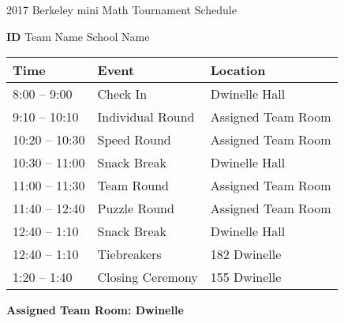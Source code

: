 \documentclass[12pt]{amsart}
\begin{document}
\renewcommand\arraystretch{3.5}
\newcommand{\TeamID}{ID}
\newcommand{\TeamName}{Team Name}
\newcommand{\SchoolName}{School Name}
\newcommand{\Room}{??}
\begin{center}
{\sc \Large 2017 Berkeley mini Math Tournament Schedule}


\bigskip


{\bf \Large  \TeamID} \hfill {\large \TeamName} \hfill {\large \SchoolName}

\bigskip
\bigskip

\begin{tabular}{| p{} | p{} | p{} |}
\hline
\bf Time       & \bf Event               & \bf Location               \\ \hline
8:00 -- 9:00   & Check In            & Dwinelle Hall       \\ \hline
9:10 -- 10:10  & Individual Round     &  Assigned Team Room        \\ \hline
10:20 -- 10:30 & Speed Round           & Assigned Team Room         \\ \hline
10:30 -- 11:00 & Snack Break            & Dwinelle Hall     \\ \hline
11:00 -- 11:30 & Team Round    &  Assigned Team Room       \\ \hline
11:40 -- 12:40 & Puzzle Round      &  Assigned Team Room       \\ \hline
12:40 -- 1:10  & Snack Break & Dwinelle Hall  \\ \hline
12:40 -- 1:10  & Tiebreakers & 182 Dwinelle                \\ \hline
1:20 -- 1:40   & Closing Ceremony    & 155 Dwinelle      \\ \hline
\end{tabular} 
\end{center}

\vspace{0.5in}

{\bf \large Assigned Team Room: \qquad\qquad Dwinelle}

\newpage
\end{document}
